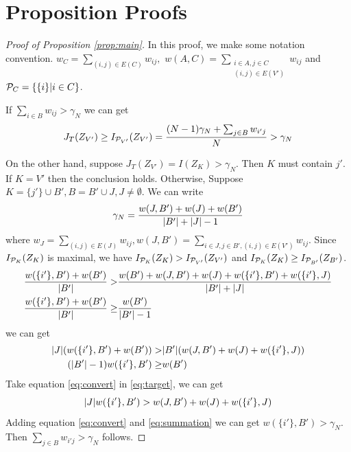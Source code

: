 \documentclass[runningheads]{llncs}
\begin{document}
\section{Proposition Proofs}
\begin{proof}[Proof of Proposition \ref{prop:main}]
		In this proof, we make some notation convention.
		$w_C = \displaystyle\sum_{(i,j) \in E(C)} w_{ij},$
		$w(A, C) = \displaystyle\sum_{\substack{i \in A, j \in C \\ (i,j) \in E(V')}} w_{ij}$ and
		$\P_C = \{\{i \}| i \in C \}$.
		
		If $ \sum_{i \in B} w_{ij} > \gamma_N$ we can get
		$$
		J_{T}(Z_{V'}) \geq I_{\P_{V'}}(Z_{V'}) = \frac{(N-1)\gamma_N + \sum_{j \in B}w_{i'j}}{N} > \gamma_N
		$$
		
		On the other hand, suppose $J_{T}(Z_{V'}) = I(Z_K) > \gamma_N$. Then $K$ must contain $j'$. If $K=V'$ then the conclusion holds. Otherwise, Suppose $K = \{j'\} \cup B', B=B'\cup J, J\neq \emptyset$. We can write 
		\begin{equation}
		\gamma_N = \frac{w(J,B') + w(J) + w(B')}{ \abs{B'} + \abs{J} - 1 }
		\end{equation}
		where $w_J = \sum_{(i,j) \in E(J)} w_{ij}, w(J, B') = \sum_{i \in J, j \in B', (i,j) \in E(V')} w_{ij}$. Since $I_{\P_K}(Z_K)$ is maximal, we have $I_{\P_K}(Z_K) > I_{\P_{V'}}(Z_{V'})$ and $I_{\P_K}(Z_K) \geq I_{\P_{B'}}(Z_{B'})$.
		\begin{align*}
			\frac{w(\{i'\}, B') + w(B')}{\abs{B'}} >& \frac{w(B') + w(J, B') + w(J) + w(\{i'\}, B') + w(\{i'\}, J)}{\abs{B'} + \abs{J}}  \\
			\frac{w(\{i'\}, B') + w(B')}{\abs{B'}} \geq & \frac{w(B')}{\abs{B'} - 1}
		\end{align*}
		we can get 
		\begin{align}
			\abs{J} (w(\{i'\}, B') + w(B')) > & \abs{B'} (w(J, B') + w(J) + w(\{i'\}, J)) \label{eq:target}
			\\
			(\abs{B'} - 1)  w(\{i'\}, B') \geq & w(B') \label{eq:convert}
		\end{align}
		Take equation \eqref{eq:convert} in \eqref{eq:target}, we can get
		\begin{equation}\label{eq:summation}
		\abs{J} w(\{i'\}, B') > w(J, B') + w(J) + w(\{i'\}, J)
		\end{equation}	
		Adding equation \eqref{eq:convert} and \eqref{eq:summation} we can get
		$w(\{i'\}, B') > \gamma_N$. Then $\sum_{j \in B}w_{i'j} > \gamma_N $ follows.
\end{proof}	
\end{document}
